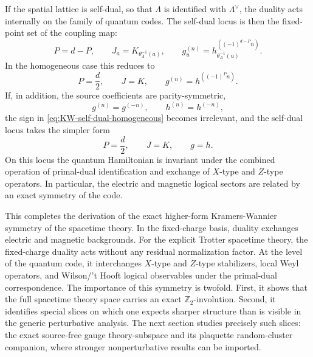 If the spatial lattice is self-dual, so that \(\Lambda\) is identified with \(\Lambda^\vee\),
the duality acts internally on the family of quantum codes. The self-dual locus is then the
fixed-point set of the coupling map:
\begin{equation}
	P=d-P,
	\qquad
	J_a=K_{\theta_\Lambda^{-1}(a)},
	\qquad
	g_u^{(n)}=h_{\theta_\Lambda^{-1}(u)}^{((-1)^{d-P}n)}.
	\label{eq:KW-self-dual-general}
\end{equation}
In the homogeneous case this reduces to
\begin{equation}
	P=\frac d2,
	\qquad
	J=K,
	\qquad
	g^{(n)}=h^{((-1)^P n)}.
	\label{eq:KW-self-dual-homogeneous}
\end{equation}
If, in addition, the source coefficients are parity-symmetric,
\begin{equation}
g^{(n)}=g^{(-n)},
\qquad
h^{(n)}=h^{(-n)},
\end{equation}
the sign in \eqref{eq:KW-self-dual-homogeneous} becomes irrelevant, and the self-dual locus
takes the simpler form
\begin{equation}
	P=\frac d2,
	\qquad
	J=K,
	\qquad
	g=h.
	\label{eq:KW-self-dual-simple}
\end{equation}
On this locus the quantum Hamiltonian is invariant under the combined operation of
primal-dual identification and exchange of \(X\)-type and \(Z\)-type operators. In
particular, the electric and magnetic logical sectors are related by an exact symmetry of
the code.

This completes the derivation of the exact higher-form Kramers-Wannier symmetry of the
spacetime theory. In the fixed-charge basis, duality exchanges electric and magnetic
backgrounds. For the explicit Trotter spacetime theory, the fixed-charge duality acts without any residual
normalization factor. At the level of the quantum code, it interchanges \(X\)-type and
\(Z\)-type stabilizers, local Weyl operators, and Wilson/'t Hooft logical observables under
the primal-dual correspondence. The importance of this symmetry is twofold. First, it
shows that the full spacetime theory space carries an exact \(\mathbb Z_2\)-involution.
Second, it identifies special slices on which one expects sharper structure than is visible
in the generic perturbative analysis. The next section studies precisely such slices: the
exact source-free gauge theory-subspace and its plaquette random-cluster companion, where stronger
nonperturbative results can be imported.








